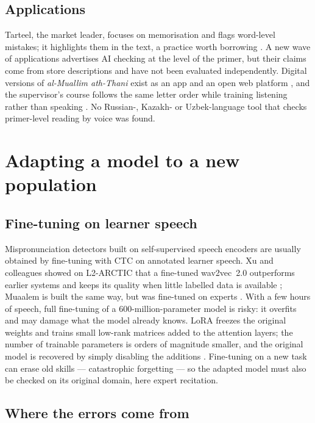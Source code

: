 \documentclass[a4paper,14pt]{extarticle}
\begin{document}
\subsection{Applications}

Tarteel, the market leader, focuses on memorisation and flags word-level mistakes; it highlights them in
the text, a practice worth borrowing \cite{SRC-046}. A new wave of applications advertises AI checking
at the level of the primer, but their claims come from store descriptions and have not been evaluated
independently. Digital versions of \emph{al-Muallim ath-Thani} exist as an app and an open web platform
\cite{SRC-005,SRC-006}, and the supervisor's course follows the same letter order while training
listening rather than speaking \cite{SRC-070}. No Russian-, Kazakh- or Uzbek-language tool that checks
primer-level reading by voice was found.

\section{Adapting a model to a new population}

\subsection{Fine-tuning on learner speech}

Mispronunciation detectors built on self-supervised speech encoders are usually obtained by fine-tuning
with CTC on annotated learner speech. Xu and colleagues showed on L2-ARCTIC that a fine-tuned wav2vec~2.0
outperforms earlier systems and keeps its quality when little labelled data is available
\cite{SRC-116}; Muaalem is built the same way, but was fine-tuned on experts \cite{SRC-002}. With a few
hours of speech, full fine-tuning of a 600-million-parameter model is risky: it overfits and may damage
what the model already knows. LoRA freezes the original weights and trains small low-rank matrices
added to the attention layers; the number of trainable parameters is orders of magnitude smaller, and
the original model is recovered by simply disabling the additions \cite{SRC-111}. Fine-tuning on a new
task can erase old skills --- catastrophic forgetting \cite{SRC-118} --- so the adapted model must also be
checked on its original domain, here expert recitation.

\subsection{Where the errors come from}
\end{document}
